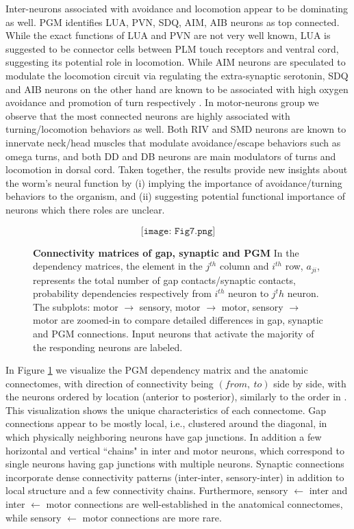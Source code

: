 \documentclass[letterpaper,11pt]{article}
\begin{document}
Inter-neurons associated with avoidance and locomotion appear to be dominating as well. PGM identifies LUA, PVN, SDQ, AIM, AIB neurons as top connected. While the exact functions of LUA and PVN are not very well known, LUA is suggested to be connector cells between PLM touch receptors and ventral cord, suggesting its potential role in locomotion. While AIM neurons are speculated to modulate the locomotion circuit via regulating the extra-synaptic serotonin, SDQ and AIB neurons on the other hand are known to be associated with high oxygen avoidance and promotion of turn respectively \cite{worm}. In motor-neurons group we observe that the most connected neurons are highly associated with turning/locomotion behaviors as well. Both RIV and SMD neurons are known to innervate neck/head muscles that modulate avoidance/escape behaviors such as omega turns, and both DD and DB neurons are main modulators of turns and locomotion in dorsal cord. Taken together, the results provide new insights about the worm's neural function by (i) implying the importance of avoidance/turning behaviors to the organism, and (ii) suggesting potential functional importance of neurons which there roles are unclear. 

\begin{figure}[t!]
    \[\texttt{[image: Fig7.png]}\]
    \caption{\textbf{Connectivity matrices of gap, synaptic and PGM} In the dependency matrices, the element in the $j^{th}$ column and $i^{th}$ row, $a_{ji}$, represents the total number of gap contacts/synaptic contacts, probability dependencies respectively from $i^{th}$ neuron to $j^th$ neuron. The subplots: motor $\rightarrow$ sensory, motor $\rightarrow$ motor, sensory $\rightarrow$ motor are zoomed-in to compare detailed differences in gap, synaptic and PGM connections. Input neurons that activate the majority of the responding neurons are labeled.}\label{fig:connmatrices}
\end{figure}

In Figure \ref{fig:connmatrices} we visualize the PGM dependency matrix and the anatomic connectomes, with direction of connectivity being $(from,~to)$ side by side, with the neurons ordered by location (anterior to posterior), similarly to the order in \cite{connectome}. This visualization shows the unique characteristics of each connectome. Gap connections appear to be mostly local, i.e., clustered around the diagonal, in which physically neighboring neurons have gap junctions. In addition a few horizontal and vertical ``chains" in inter and motor neurons, which correspond to single neurons having gap junctions with multiple neurons. Synaptic connections incorporate dense connectivity patterns (inter-inter, sensory-inter) in addition to local structure and a few connectivity chains. 
Furthermore, sensory $\leftarrow$ inter and inter $\leftarrow$ motor connections are well-established in the anatomical connectomes, while sensory $\leftarrow$ motor connections are more rare.
\end{document}
